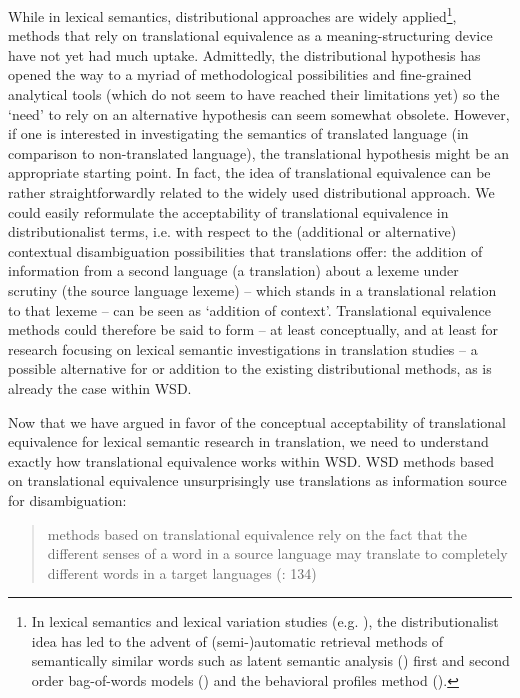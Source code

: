 While in lexical semantics, distributional approaches are widely applied\footnote{In lexical semantics and lexical variation studies (e.g. \citealt{peirsman_automatic_2010}), the distributionalist idea has led to the advent of (semi-)automatic retrieval methods of semantically similar words such as latent semantic analysis (\citealt{landauer_solution_1997}) first and second order bag-of-words models (\citealt{manning_foundations_1999}) and the behavioral profiles method (\citealt{divjak_ways_2006, evans_behavioral_2009}).}, methods that rely on translational equivalence as a meaning-structuring device have not yet had much uptake. Admittedly, the distributional hypothesis has opened the way to a myriad of methodological possibilities and fine-grained analytical tools (which do not seem to have reached their limitations yet) so the ‘need’ to rely on an alternative hypothesis can seem somewhat obsolete. However, if one is interested in investigating the semantics of translated language (in comparison to non-translated language), the translational hypothesis might be an appropriate starting point. In fact, the idea of translational equivalence can be rather straightforwardly related to the widely used distributional approach. We could easily reformulate the acceptability of translational equivalence in distributionalist terms, i.e. with respect to the (additional or alternative) contextual disambiguation possibilities that translations offer: the addition of information from a second language (a translation) about a lexeme under scrutiny (the source language lexeme) – which stands in a translational relation to that lexeme – can be seen as ‘addition of context’. Translational equivalence methods could therefore be said to form – at least conceptually, and at least for research focusing on lexical semantic investigations in translation studies – a possible alternative for or addition to the existing distributional methods, as is already the case within WSD.



Now that we have argued in favor of the conceptual acceptability of translational equivalence for lexical semantic research in translation, we need to understand exactly how translational equivalence works within WSD. WSD methods based on translational equivalence unsurprisingly use translations as information source for disambiguation:


\begin{quote}
methods based on translational equivalence rely on the fact that the different senses of a word in a source language may translate to completely different words in a target languages (\citealt{agirre_unsupervised_2007}: 134)
\end{quote}


